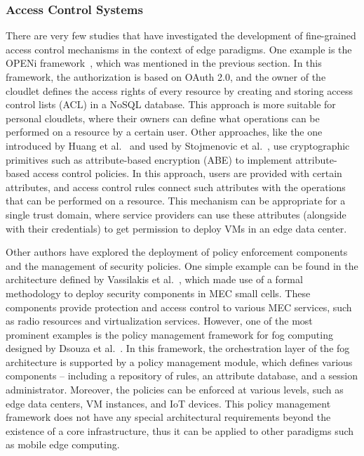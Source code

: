 \documentclass[twocolumn,preprint,3p]{elsarticle}
\begin{document}
\subsubsection{Access Control Systems}

There are very few studies that have investigated the development of fine-grained access control mechanisms in the context of edge paradigms. One example is the OPENi framework~\cite{McCarthy15}, which was mentioned in the previous section. In this framework, the authorization is based on OAuth 2.0, and the owner of the cloudlet defines the access rights of every resource by creating and storing access control lists (ACL) in a NoSQL database. This approach is more suitable for personal cloudlets, where their owners can define what operations can be performed on a resource by a certain user. Other approaches, like the one introduced by Huang et al.~\cite{HuangX14} and used by Stojmenovic et al.~\cite{StojmenovicFSec05}, use cryptographic primitives such as attribute-based encryption (ABE) to implement attribute-based access control policies. In this approach, users are provided with certain attributes, and access control rules connect such attributes with the operations that can be performed on a resource. This mechanism can be appropriate for a single trust domain, where service providers can use these attributes (alongside with their credentials) to get permission to deploy VMs in an edge data center.

Other authors have explored the deployment of policy enforcement components and the management of security policies. One simple example can be found in the architecture defined by Vassilakis et al.~\cite{Vassilakis2016a}, which made use of a formal methodology to deploy security components in MEC small cells. These components provide protection and access control to various MEC services, such as radio resources and virtualization services. However, one of the most prominent examples is the policy management framework for fog computing designed by Dsouza et al.~\cite{Dsouza14}. In this framework, the orchestration layer of the fog architecture is supported by a policy management module, which defines various components -- including a repository of rules, an attribute database, and a session administrator. Moreover, the policies can be enforced at various levels, such as edge data centers, VM instances, and IoT devices. This policy management framework does not have any special architectural requirements beyond the existence of a core infrastructure, thus it can be applied to other paradigms such as mobile edge computing.
\end{document}
